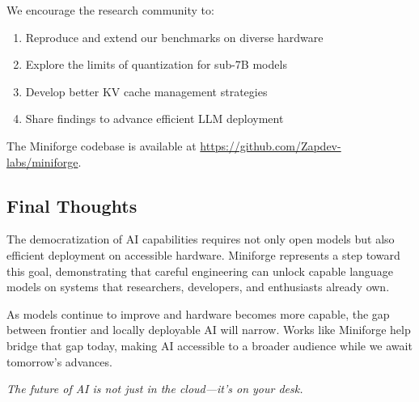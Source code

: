 We encourage the research community to:

\begin{enumerate}
    \item Reproduce and extend our benchmarks on diverse hardware
    \item Explore the limits of quantization for sub-7B models
    \item Develop better KV cache management strategies
    \item Share findings to advance efficient LLM deployment
\end{enumerate}

The Miniforge codebase is available at \url{https://github.com/Zapdev-labs/miniforge}.

\subsection{Final Thoughts}

The democratization of AI capabilities requires not only open models but also efficient deployment on accessible hardware. Miniforge represents a step toward this goal, demonstrating that careful engineering can unlock capable language models on systems that researchers, developers, and enthusiasts already own.

As models continue to improve and hardware becomes more capable, the gap between frontier and locally deployable AI will narrow. Works like Miniforge help bridge that gap today, making AI accessible to a broader audience while we await tomorrow's advances.

\vspace{1em}
\begin{center}
\textit{The future of AI is not just in the cloud---it's on your desk.}
\end{center}
